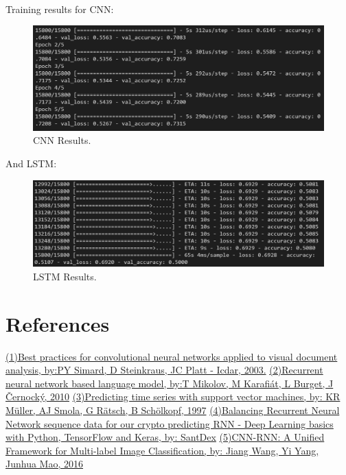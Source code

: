 \documentclass{article}
\begin{document}
  \paragraph{}
  Training results for CNN:
  \begin{figure}[h!]
    \begin{center}
      \includegraphics[width=\linewidth]{img/image4.png}
      \caption{CNN Results.}
      \label{fig:snn}
    \end{center}
  \end{figure}
  And LSTM:
  \begin{figure}[h!]
    \begin{center}
      \includegraphics[width=\linewidth]{img/image1.png}
      \caption{LSTM Results.}
      \label{fig:snn}
    \end{center}
  \end{figure}

  \newpage
  \section{References}
  \href{http://www.cs.cmu.edu/~bhiksha/courses/deeplearning/Fall.2016/pdfs/Simard.pdf}{(1)Best practices for convolutional neural networks applied to visual document analysis, by:PY Simard, D Steinkraus, JC Platt - Icdar, 2003.}
  \newline
  \href{https://www.isca-speech.org/archive/interspeech_2010/i10_1045.html}{(2)Recurrent neural network based language model, by:T Mikolov, M Karafiát, L Burget, J Černocký, 2010}
  \newline
  \href{https://link.springer.com/chapter/10.1007/BFb0020283}{(3)Predicting time series with support vector machines, by: KR Müller, AJ Smola, G Rätsch, B Schölkopf, 1997}
  \newline
  \href{https://pythonprogramming.net/balancing-rnn-data-deep-learning-python-tensorflow-keras/}{(4)Balancing Recurrent Neural Network sequence data for our crypto predicting RNN - Deep Learning basics with Python, TensorFlow and Keras, by: SantDex}
  \newline
  \href{https://www.cv-foundation.org/openaccess/content_cvpr_2016/papers/Wang_CNN-RNN_A_Unified_CVPR_2016_paper.pdf}{(5)CNN-RNN: A Unified Framework for Multi-label Image Classification, by: Jiang Wang, Yi Yang, Junhua Mao, 2016}

  
\end{document}
